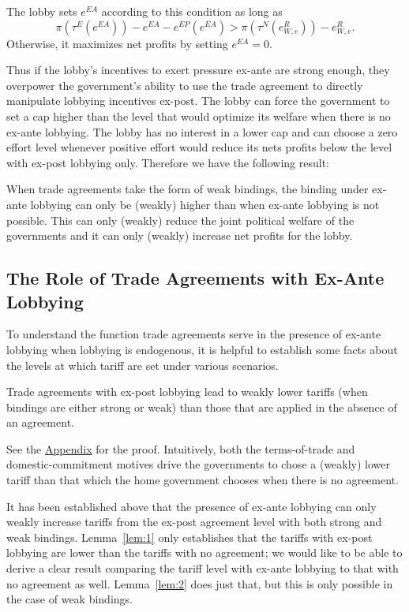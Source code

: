 The lobby sets $e^{EA}$ according to this condition as long as 
	\begin{equation}
		\pi(\tau^E(e^{EA})) - e^{EA} - e^{EP}(e^{EA}) > \pi(\tau^N(e^R_{W,e})) - e^R_{W,e}.
		\label{ine:ea}
	\end{equation}
Otherwise, it maximizes net profits by setting $e^{EA} =0$.	

Thus if the lobby's incentives to exert pressure ex-ante are strong enough, they overpower the government's ability to use the trade agreement to directly manipulate lobbying incentives ex-post. The lobby can force the government to set a cap higher than the level that would optimize its welfare when there is no ex-ante lobbying. The lobby has no interest in a lower cap and can choose a zero effort level whenever positive effort would reduce its nets profits below the level with ex-post lobbying only. Therefore we have the following result:
		
\begin{proposition}
	When trade agreements take the form of weak bindings, the binding under ex-ante lobbying can only be (weakly) higher than when ex-ante lobbying is not possible. This can only (weakly) reduce the joint political welfare of the governments and it can only (weakly) increase net profits for the lobby.
\end{proposition}

\subsection{The Role of Trade Agreements with Ex-Ante Lobbying}				
To understand the function trade agreements serve in the presence of ex-ante lobbying when lobbying is endogenous, it is helpful to establish some facts about the levels at which tariff are set under various scenarios.

\begin{lemma}
  Trade agreements with ex-post lobbying lead to weakly lower tariffs (when bindings are either strong or weak) than those that are applied in the absence of an agreement.
	\label{lem:1}
\end{lemma}

See the \hyperlink{lem1}{Appendix} for the proof. Intuitively, both the terms-of-trade and domestic-commitment motives drive the governments to chose a (weakly) lower tariff than that which the home government chooses when there is no agreement.

It has been established above that the presence of ex-ante lobbying can only weakly increase tariffs from the ex-post agreement level with both strong and weak bindings. Lemma~\ref{lem:1} only establishes that the tariffs with ex-post lobbying are lower than the tariffs with no agreement; we would like to be able to derive a clear result comparing the tariff level with ex-ante lobbying to that with no agreement as well. Lemma~\ref{lem:2} does just that, but this is only possible in the case of weak bindings.

